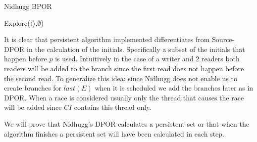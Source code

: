 \begin{algorithm}
    \caption{Nidhugg BPOR}
    Explore($\langle \rangle$,$\emptyset$)\;
\end{algorithm}

It is clear that persistent algorithm implemented differentiates from Source-DPOR in the calculation of the initials. 
Specifically a subset of the initials that happen before $p$ is used. 
Intuitively in the case of a writer and 2 readers both readers will be added to the branch since the first read does not happen before the second read.
To generalize this idea: since Nidhugg does not enable us to create branches for $last(E)$ when it is scheduled we add the branches later as in DPOR. When
a race is considered usually only the thread that causes the race will be added since $CI$ contains this thread only.

We will prove that Nidhugg's DPOR calculates a persistent set or that when the algorithm finishes a persistent set will have been calculated in each step.

